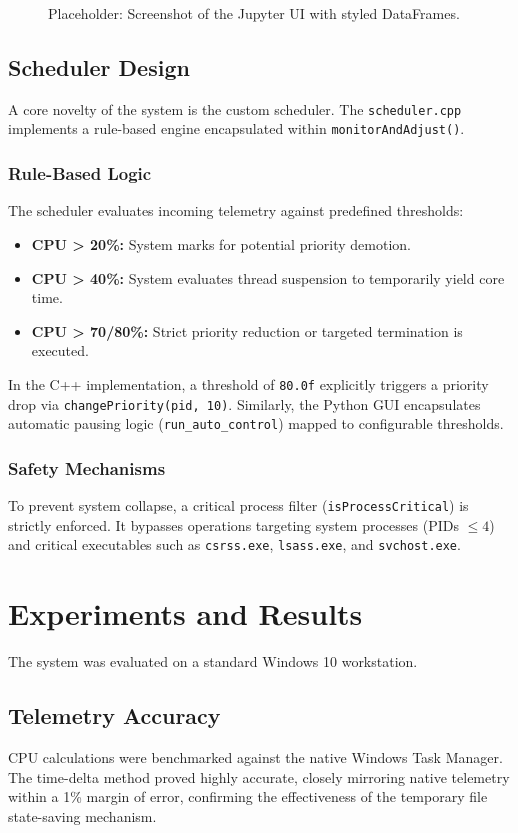 \documentclass{article}
\begin{document}
\begin{figure}[h]
\centering
\fbox{\rule{0pt}{2in} \rule{0.9\linewidth}{0pt}}
\caption{Placeholder: Screenshot of the Jupyter UI with styled DataFrames.}
\end{figure}

\subsection{Scheduler Design}
A core novelty of the system is the custom scheduler. The \texttt{scheduler.cpp} implements a rule-based engine encapsulated within \texttt{monitorAndAdjust()}.

\subsubsection{Rule-Based Logic}
The scheduler evaluates incoming telemetry against predefined thresholds:
\begin{itemize}
    \item \textbf{CPU > 20\%:} System marks for potential priority demotion.
    \item \textbf{CPU > 40\%:} System evaluates thread suspension to temporarily yield core time.
    \item \textbf{CPU > 70/80\%:} Strict priority reduction or targeted termination is executed.
\end{itemize}
In the C++ implementation, a threshold of \texttt{80.0f} explicitly triggers a priority drop via \texttt{changePriority(pid, 10)}. Similarly, the Python GUI encapsulates automatic pausing logic (\texttt{run\_auto\_control}) mapped to configurable thresholds.

\subsubsection{Safety Mechanisms}
To prevent system collapse, a critical process filter (\texttt{isProcessCritical}) is strictly enforced. It bypasses operations targeting system processes (PIDs $\le 4$) and critical executables such as \texttt{csrss.exe}, \texttt{lsass.exe}, and \texttt{svchost.exe}.

\section{Experiments and Results}
The system was evaluated on a standard Windows 10 workstation. 

\subsection{Telemetry Accuracy}
CPU calculations were benchmarked against the native Windows Task Manager. The time-delta method proved highly accurate, closely mirroring native telemetry within a 1\% margin of error, confirming the effectiveness of the temporary file state-saving mechanism. 
\end{document}
